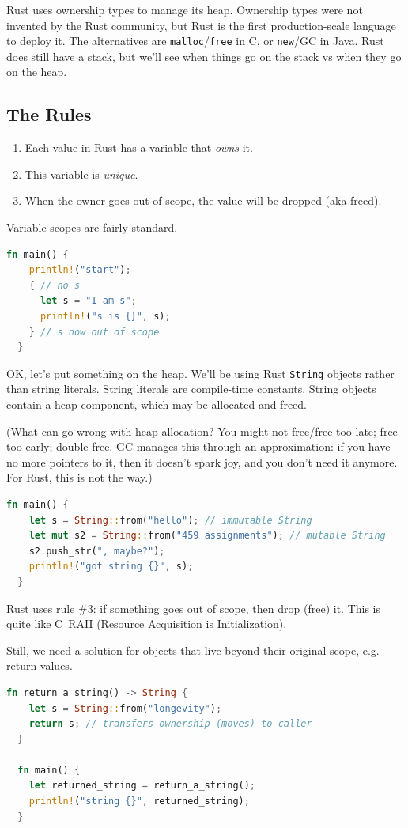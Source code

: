 \documentclass[a4paper]{report}
\newcommand{\CPP}{C\nolinebreak\hspace{-.05em}\raisebox{.4ex}{\tiny\bf +}\nolinebreak\hspace{-.10em}\raisebox{.4ex}{\tiny\bf +}}
\def\CPP{{C\nolinebreak[4]\hspace{-.05em}\raisebox{.4ex}{\tiny\bf ++}}}
\begin{document}
Rust uses ownership types to manage its heap. Ownership types were not invented by the Rust
community, but Rust is the first production-scale language to deploy it. The alternatives
are {\tt malloc}/{\tt free} in C, or {\tt new}/GC in Java. Rust does still have a stack, but
we'll see when things go on the stack vs when they go on the heap.

\subsection*{The Rules}
\begin{enumerate}[noitemsep]
\item Each value in Rust has a variable that \emph{owns} it.
\item This variable is \emph{unique}.
\item When the owner goes out of scope, the value will be dropped (aka freed).
\end{enumerate}

Variable scopes are fairly standard.
\begin{lstlisting}[language=Rust]
  fn main() {
    println!("start");
    { // no s
      let s = "I am s";
      println!("s is {}", s);
    } // s now out of scope
  }
\end{lstlisting}

OK, let's put something on the heap. We'll be using Rust {\tt String} objects rather than
string literals. String literals are compile-time constants. String objects contain a heap component,
which may be allocated and freed.

(What can go wrong with heap allocation? You might not free/free too late;
free too early; double free. GC manages this through an approximation: if you have no more pointers to it,
then it doesn't spark joy, and you don't need it anymore. For Rust, this is not the way.)
\begin{lstlisting}[language=Rust]
  fn main() {
    let s = String::from("hello"); // immutable String
    let mut s2 = String::from("459 assignments"); // mutable String
    s2.push_str(", maybe?");
    println!("got string {}", s);
  }
\end{lstlisting}

Rust uses rule \#3: if something goes out of scope, then drop (free) it.
This is quite like \CPP~RAII (Resource Acquisition is Initialization).

Still, we need a solution for objects that live beyond their original scope, e.g.
return values.
\begin{lstlisting}[language=Rust]
  fn return_a_string() -> String {
    let s = String::from("longevity");
    return s; // transfers ownership (moves) to caller
  }

  fn main() {
    let returned_string = return_a_string();
    println!("string {}", returned_string);
  }
\end{lstlisting}
\end{document}
